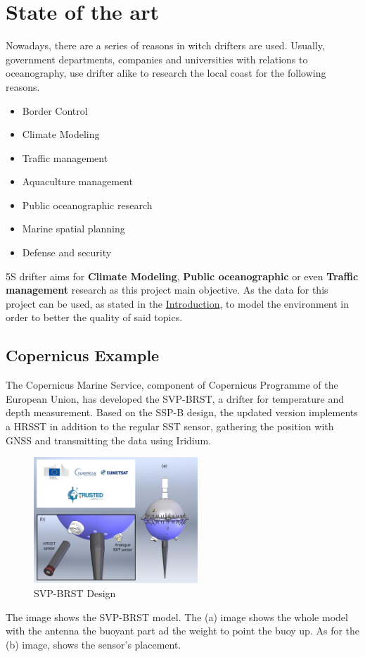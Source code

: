 \section{State of the art}
Nowadays, there are a series of reasons in witch drifters are used. Usually, government 
departments, companies and universities with relations to oceanography, use drifter alike 
to research the local coast for the following reasons.

\begin{itemize}
    \item Border Control
    \item Climate Modeling
    \item Traffic management
    \item Aquaculture management
    \item Public oceanographic research
    \item Marine spatial planning
    \item Defense and security
\end{itemize}

5S drifter aims for \textbf{Climate Modeling}, \textbf{Public oceanographic} or even \textbf{Traffic management} research as this project main objective.
As the data for this project can be used, as stated in the \hyperref[sec:Problem Statement]{Introduction}, to model the environment
in order to better the quality of said topics.
\subsection{Copernicus Example}

The Copernicus Marine Service, component of Copernicus Programme of the 
European Union, has developed the SVP-BRST, a drifter for temperature and depth measurement.
Based on the SSP-B design, the updated version implements a HRSST in addition to the regular 
SST sensor, gathering the position with GNSS and transmitting the data using Iridium.
\begin{figure}[H]
    \centering
    \includegraphics[width=0.55\textwidth]{images/chapter/analysis/svp.png}  %
    \caption{SVP-BRST Design}
    \label{fig:SVP-BRST Design}        
\end{figure}
The image shows the SVP-BRST model. The (a) image shows the whole model with the antenna the buoyant part ad the weight to point the buoy up.
As for the (b) image, shows the sensor's placement. 

